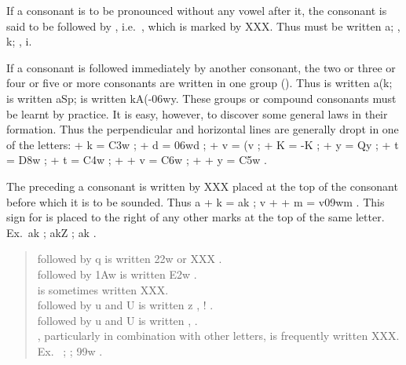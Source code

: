 \s If a consonant is to be pronounced without any vowel after it, the
consonant is said to be followed by , i.e.\ ,
which is marked by XXX. Thus  must be written {\dn a}; ,
{\dn k}; , {\dn i}.

\s If a consonant is followed immediately by another consonant, the two
or three or four or five or more consonants are written in one group
(). Thus  is written {\dn a(k};  is written
{\dn aSp};  is written {\dn kA(-\306wy\0}. These groups or compound
consonants must be learnt by practice. It is easy, however, to discover
some general laws in their formation. Thus the perpendicular and
horizontal lines are generally dropt in one of the letters: {\dn {}} + {\dn k}
= {\dn \3C3w} ; {\dn {}} + {\dn d} = {\dn \306wd} ; {\dn {}} + {\dn v} = {\dn (v}
; {\dn {}} + {\dn K} = {\dn -K} ; {\dn {}} + {\dn y} = {\dn Qy} ;
{\dn {}} + {\dn t} = {\dn \3D8w} ; {\dn {}} + {\dn t} = {\dn \3C4w} ; {\dn {}} + {\dn {}}
+ {\dn v} = {\dn \3C6w} ; {\dn {}} + {\dn {}} + {\dn y} = {\dn \3C5w} .

\s The {\dn {}}  preceding a consonant is written by XXX placed at the
top of the consonant before which it is to be sounded. Thus {\dn a} + {\dn k}
= {\dn ak\0} ; {\dn v} + {\dn {}} + {\dn m} = {\dn v\309wm\0} . This
sign for {\dn {}}  is placed to the right of any other marks at the
top of the same letter. Ex.\ {\dn ak{\rdt}} ; {\dn ak\?{\qvb}Z} ;
{\dn ak\?{\qvc}} .

\begin{quote}
  {\dn {}}  followed by {\dn q}  is written {\dn \322w} or XXX
  .\\
  {\dn {}}  followed by {\dn \31Aw}  is written {\dn \3E2w} .\\
  {\dn {}}  is sometimes written XXX.\\
  {\dn {}}  followed by {\dn u}  and {\dn U}  is written {\dn z}
  , {\dn !} .\\
  {\dn {}}  followed by {\dn u}  and {\dn U}  is written {\dn {}}
  , {\dn {}} .\\
  {\dn {}} , particularly in combination with other letters, is
  frequently written XXX. Ex.\ {\dn {}} ; {\dn {}} ; {\dn \399w}
  .
\end{quote}

